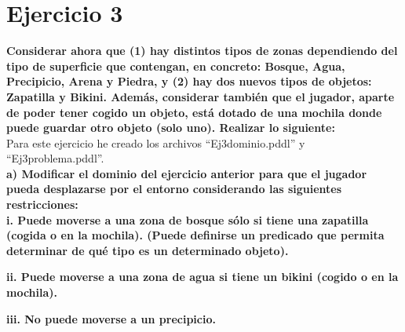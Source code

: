 \documentclass[12pt]{article}
\begin{document}
\section{Ejercicio 3} \textbf{Considerar ahora que (1) hay distintos tipos de zonas dependiendo del tipo de superficie que contengan, en concreto: Bosque, Agua, Precipicio, Arena y Piedra, y (2) hay dos nuevos tipos de objetos: Zapatilla y Bikini. Además, considerar también que el jugador, aparte de poder tener cogido un objeto, está dotado de una mochila donde puede guardar otro objeto (solo uno). Realizar lo siguiente:}\\

Para este ejercicio he creado los archivos ``Ej3dominio.pddl'' y ``Ej3problema.pddl''.\\

\textbf{a) Modificar el dominio del ejercicio anterior para que el jugador pueda desplazarse por el entorno considerando las siguientes restricciones:}\\

\textbf{i. Puede moverse a una zona de bosque sólo si tiene una zapatilla (cogida o en la mochila). (Puede definirse un predicado que permita determinar de qué tipo es un determinado objeto).}

\textbf{ii. Puede moverse a una zona de agua si tiene un bikini (cogido o en la mochila).}

\textbf{iii. No puede moverse a un precipicio.}\\
\end{document}
